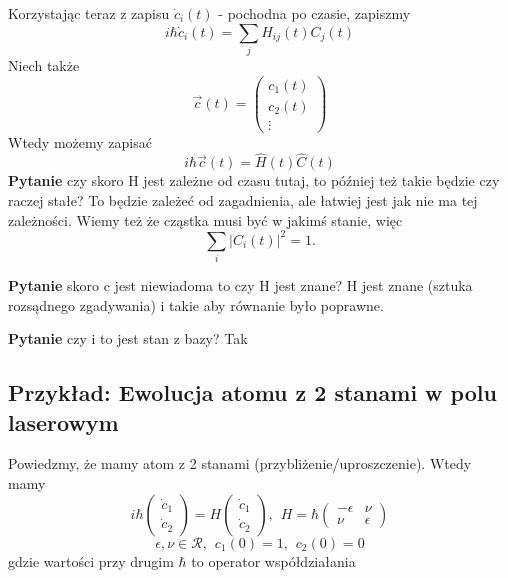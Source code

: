 Korzystając teraz z zapisu $\dot{c}_i(t)$ - pochodna po czasie, zapiszmy
\begin{equation*}
	i\hbar \dot{c}_i(t) = \sum_j H_{ij}(t) C_j(t)
\end{equation*}
Niech także
\begin{equation*}
	\overrightarrow{c}(t) = \begin{pmatrix} c_1(t) \\ c_2(t) \\ \vdots \end{pmatrix}
\end{equation*}
Wtedy możemy zapisać
\begin{equation*}
	i\hbar \overrightarrow{c}(t) =  \hat{H}(t) \hat{C}(t)
\end{equation*}
\textbf{Pytanie} czy skoro H jest zależne od czasu tutaj, to później też takie będzie czy raczej stałe? To będzie zależeć od zagadnienia, ale łatwiej jest jak nie ma tej zależności.
Wiemy też że cząstka musi być w jakimś stanie, więc
\begin{equation*}
	\sum_i \vert C_i(t)\vert^2 = 1.
\end{equation*}

\textbf{Pytanie} skoro c jest niewiadoma to czy H jest znane? H jest znane (sztuka rozsądnego zgadywania) i takie aby równanie było poprawne.

\textbf{Pytanie} czy i to jest stan z bazy? Tak
\subsection{Przykład: Ewolucja atomu z 2 stanami w polu laserowym}
Powiedzmy, że mamy atom z 2 stanami (przybliżenie/uproszczenie). Wtedy mamy
\begin{equation*}
	i\hbar \begin{pmatrix} \dot{c}_1\\ \dot{c}_2 \end{pmatrix} = H \begin{pmatrix} \dot{c}_1\\ \dot{c}_2 \end{pmatrix} , \hspace{5pt} H = \hbar \begin{pmatrix} -\epsilon & \nu \\ \nu & \epsilon  \end{pmatrix}
\end{equation*}
\begin{equation*}
\epsilon, \nu \in \mathcal{R}, \hspace{5pt} c_1(0) = 1, \hspace{5pt} c_2(0) = 0
\end{equation*}
gdzie wartości przy drugim $\hbar$ to operator współdziałania

